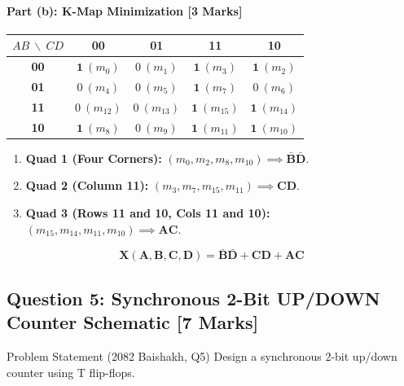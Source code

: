 \documentclass[11pt,a4paper,oneside]{book}
\begin{document}
\paragraph{Part (b): K-Map Minimization [3 Marks]}
\begin{center}
\begin{tabular}{|c|c|c|c|c|}
\hline
$AB \ \backslash \ CD$ & \textbf{00} & \textbf{01} & \textbf{11} & \textbf{10} \\ \hline
\textbf{00} & $\mathbf{1}\ (m_0)$ & $0\ (m_1)$ & $\mathbf{1}\ (m_3)$ & $\mathbf{1}\ (m_2)$ \\ \hline
\textbf{01} & $0\ (m_4)$ & $0\ (m_5)$ & $\mathbf{1}\ (m_7)$ & $0\ (m_6)$ \\ \hline
\textbf{11} & $0\ (m_{12})$ & $0\ (m_{13})$ & $\mathbf{1}\ (m_{15})$ & $\mathbf{1}\ (m_{14})$ \\ \hline
\textbf{10} & $\mathbf{1}\ (m_8)$ & $0\ (m_9)$ & $\mathbf{1}\ (m_{11})$ & $\mathbf{1}\ (m_{10})$ \\ \hline
\end{tabular}
\end{center}
\begin{enumerate}
  \item \textbf{Quad 1 (Four Corners):} $(m_0, m_2, m_8, m_{10}) \implies \mathbf{\bar{B}\bar{D}}$.
  \item \textbf{Quad 2 (Column 11):} $(m_3, m_7, m_{15}, m_{11}) \implies \mathbf{CD}$.
  \item \textbf{Quad 3 (Rows 11 and 10, Cols 11 and 10):} $(m_{15}, m_{14}, m_{11}, m_{10}) \implies \mathbf{AC}$.
\end{enumerate}

\begin{answerbox}
$$\mathbf{X(A,B,C,D) = \bar{B}\bar{D} + CD + AC}$$
\end{answerbox}

\vspace{0.6cm}

\subsection{Question 5: Synchronous 2-Bit UP/DOWN Counter Schematic [7 Marks]}
\begin{questionbox}{Problem Statement (2082 Baishakh, Q5)}
Design a synchronous 2-bit up/down counter using T flip-flops.
\end{questionbox}
\end{document}
